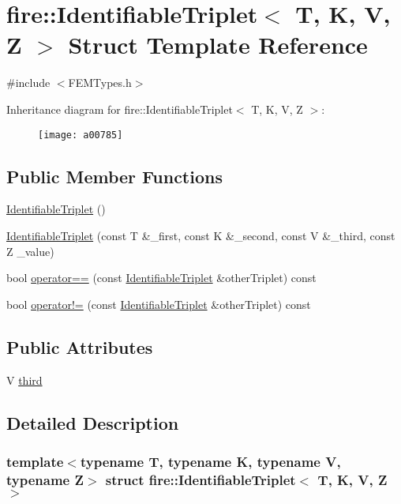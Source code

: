 \hypertarget{a00785}{}\section{fire\+:\+:Identifiable\+Triplet$<$ T, K, V, Z $>$ Struct Template Reference}
\label{a00785}


{\ttfamily \#include $<$F\+E\+M\+Types.\+h$>$}

Inheritance diagram for fire\+:\+:Identifiable\+Triplet$<$ T, K, V, Z $>$\+:\begin{figure}[H]
\begin{center}
\leavevmode
\texttt{[image: a00785]}
\end{center}
\end{figure}
\subsection*{Public Member Functions}
\begin{DoxyCompactItemize}
\item 
\hyperlink{a00785_aadcc9b484d16fc1f286e969bad059976}{Identifiable\+Triplet} ()
\item 
\hyperlink{a00785_a4c43fb95e33d2b67ffb934991a986b68}{Identifiable\+Triplet} (const T \&\+\_\+first, const K \&\+\_\+second, const V \&\+\_\+third, const Z \+\_\+value)
\item 
bool \hyperlink{a00785_a3b79a05585bf33cc7aef48697a804be1}{operator==} (const \hyperlink{a00785}{Identifiable\+Triplet} \&other\+Triplet) const
\item 
bool \hyperlink{a00785_a290e248f174f39b7df8b2017f77c179f}{operator!=} (const \hyperlink{a00785}{Identifiable\+Triplet} \&other\+Triplet) const
\end{DoxyCompactItemize}
\subsection*{Public Attributes}
\begin{DoxyCompactItemize}
\item 
V \hyperlink{a00785_a0f60248b00531643f3c6bb8e68781f04}{third}
\end{DoxyCompactItemize}


\subsection{Detailed Description}
\subsubsection*{template$<$typename T, typename K, typename V, typename Z$>$\newline
struct fire\+::\+Identifiable\+Triplet$<$ T, K, V, Z $>$}

